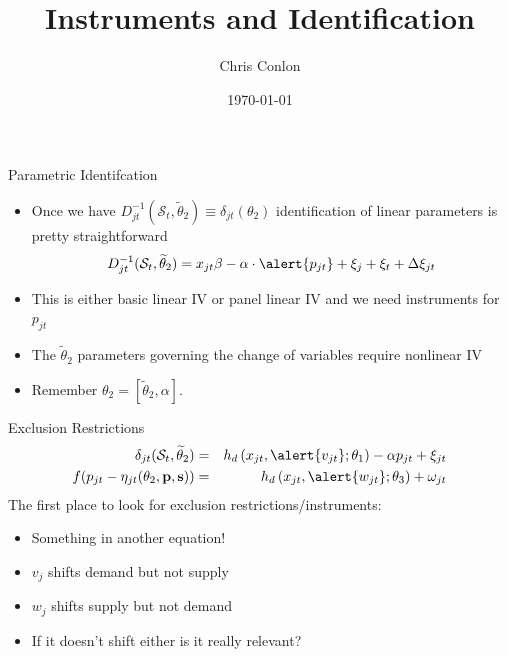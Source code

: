 \documentclass[xcolor=pdftex,dvipsnames,table,mathserif,aspectratio=169]{beamer}
\begin{document}
\title{Instruments and Identification }
\author{Chris Conlon}
\date{\today}

\frame{\titlepage}

\begin{frame}{Parametric Identifcation}
\begin{itemize}
\item Once we have $D_{jt}^{-1}(\mathcal{S}_t,\widetilde{\theta}_2)\equiv \delta_{jt}(\theta_2)$ identification of linear parameters is pretty straightforward
\begin{eqnarray*}
D_{jt}^{-1}(\mathcal{S}_t,\widetilde{\theta}_2) = x_{jt} \beta -  \alpha \cdot \alert{ p_{jt}} + \xi_j + \xi_t + \Delta \xi_{jt}
\end{eqnarray*}
\item This is either basic linear IV or panel linear IV and we need instruments for $p_{jt}$
\item The $\widetilde{\theta}_2$ parameters governing the change of variables require \alert{nonlinear IV}
\item Remember $\theta_2 =  [\widetilde{\theta}_2, \alpha]$.
\end{itemize}
\end{frame}

\begin{frame}{Exclusion Restrictions}
\begin{eqnarray*}
    \delta_{jt}(\mathcal{S}_t,\widetilde{\theta}_2) &=&  h_d\left(x_{jt}, \alert{v_{jt}}; \theta_1 \right)  - \alpha p_{jt} + \xi_{jt}\\
    f(p_{jt} - \eta_{jt}(\theta_2,\mathbf{p},\mathbf{s})) &=&   h_d\left(x_{jt},\alert{w_{jt}};\theta_3 \right)+\omega_{jt}
\end{eqnarray*}
The first place to look for exclusion restrictions/instruments:
\begin{itemize}
\item Something in another equation!
\item $v_j$ shifts demand but not supply
\item $w_j$ shifts supply but not demand
\item If it doesn't shift either is it really relevant?
\end{itemize}
\end{frame}
\end{document}
